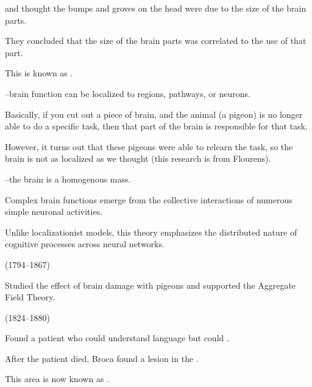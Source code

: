 \begin{coloredlist}
    \item {} and  thought the bumps and groves on the head were due to the size of the brain parts.
    \item They concluded that the size of the brain parts was correlated to the use of that part.
    \item This is known as .
    \item {}--brain function can be localized to regions, pathways, or neurons.
    \begin{coloredlist}
        \item Basically, if you cut out a piece of brain, and the animal (a pigeon) is no longer able to do a specific task, then that part of the brain is responsible for that task.
        \item However, it turns out that these pigeons were able to relearn the task, so the brain is not as localized as we thought (this research is from Flourens).
    \end{coloredlist}
    \item {}--the brain is a homogenous mass.
    \begin{coloredlist}
        \item Complex brain functions emerge from the collective interactions of numerous simple neuronal activities.
        \item Unlike localizationist models, this theory emphasizes the distributed nature of cognitive processes across neural networks.
    \end{coloredlist}
    \item {} (1794--1867)
    \begin{coloredlist}
        \item Studied the effect of brain damage with pigeons and supported the Aggregate Field Theory.
    \end{coloredlist}
    \item {} (1824--1880)
    \begin{coloredlist}
        \item Found a patient who could understand language but could .
        \item After the patient died, Broca found a lesion in the .
        \item This area is now known as .

\end{coloredlist}
\end{coloredlist}
